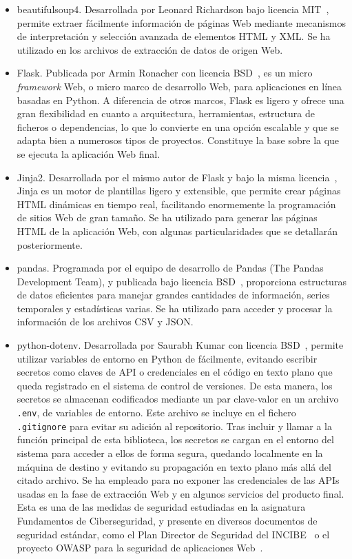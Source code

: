 \begin{itemize}
    \item beautifulsoup4. Desarrollada por Leonard Richardson bajo licencia MIT~\cite{beautifulsoup4}, permite extraer fácilmente información de páginas Web mediante mecanismos de interpretación y selección avanzada de elementos HTML y XML. Se ha utilizado en los archivos de extracción de datos de origen Web.
    \item Flask. Publicada por Armin Ronacher con licencia BSD~\cite{flask}, es un micro \textit{framework} Web, o micro marco de desarrollo Web, para aplicaciones en línea basadas en Python. A diferencia de otros marcos, Flask es ligero y ofrece una gran flexibilidad en cuanto a arquitectura, herramientas, estructura de ficheros o dependencias, lo que lo convierte en una opción escalable y que se adapta bien a numerosos tipos de proyectos. Constituye la base sobre la que se ejecuta la aplicación Web final.
    \item Jinja2. Desarrollada por el mismo autor de Flask y bajo la misma licencia~\cite{jinja2}, Jinja es un motor de plantillas ligero y extensible, que permite crear páginas HTML dinámicas en tiempo real, facilitando enormemente la programación de sitios Web de gran tamaño. Se ha utilizado para generar las páginas HTML de la aplicación Web, con algunas particularidades que se detallarán posteriormente.
    \item pandas. Programada por el equipo de desarrollo de Pandas (\guillemotleft The Pandas Development Team\guillemotright\space), y publicada bajo licencia BSD~\cite{pandas}, proporciona estructuras de datos eficientes para manejar grandes cantidades de información, series temporales y estadísticas varias. Se ha utilizado para acceder y procesar la información de los archivos CSV y JSON.
    \item python-dotenv. Desarrollada por Saurabh Kumar con licencia BSD~\cite{py_dotenv}, permite utilizar variables de entorno en Python de fácilmente, evitando escribir secretos como claves de API o credenciales en el código en texto plano que queda registrado en el sistema de control de versiones. De esta manera, los secretos se almacenan codificados mediante un par clave-valor en un archivo \texttt{.env}, de variables de entorno. Este archivo se incluye en el fichero \texttt{.gitignore} para evitar su adición al repositorio. Tras incluir y llamar a la función principal de esta biblioteca, los secretos se cargan en el entorno del sistema para acceder a ellos de forma segura, quedando localmente en la máquina de destino y evitando su propagación en texto plano más allá del citado archivo. Se ha empleado para no exponer las credenciales de las APIs usadas en la fase de extracción Web y en algunos servicios del producto final. Esta es una de las medidas de seguridad estudiadas en la asignatura \guillemotleft Fundamentos de Ciberseguridad\guillemotright, y presente en diversos documentos de seguridad estándar, como el Plan Director de Seguridad del INCIBE~\cite{INCIBE} o el proyecto OWASP para la seguridad de aplicaciones Web~\cite{OWASP}.

\end{itemize}
